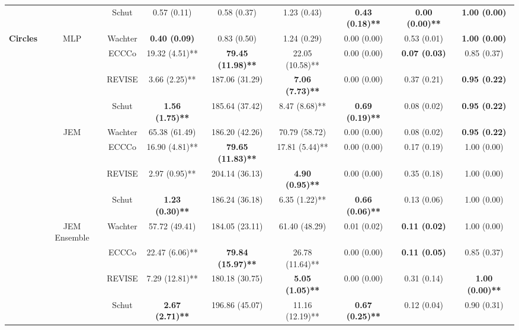 \begin{table}
{\begin{tabular}[t]{>{}c|c|c|c|c|c|c|c|c}
 &  & Schut & 0.57 (0.11) & 0.58 (0.37) & 1.23 (0.43) & \textbf{0.43 (0.18)**} & \textbf{0.00 (0.00)**} & \textbf{1.00 (0.00)}\\

\multirow{-12}{*}{\centering\arraybackslash \textbf{Circles}} & \multirow{-6}{*}{\centering\arraybackslash MLP} & Wachter & \textbf{0.40 (0.09)} & 0.83 (0.50) & 1.24 (0.29) & 0.00 (0.00) & 0.53 (0.01) & \textbf{1.00 (0.00)}\\
\cline{1-9}
 &  & ECCCo & 19.32 (4.51)** & \textbf{79.45 (11.98)**} & 22.05 (10.58)** & 0.00 (0.00) & \textbf{0.07 (0.03)} & 0.85 (0.37)\\

 &  & REVISE & 3.66 (2.25)** & 187.06 (31.29) & \textbf{7.06 (7.73)**} & 0.00 (0.00) & 0.37 (0.21) & \textbf{0.95 (0.22)}\\

 &  & Schut & \textbf{1.56 (1.75)**} & 185.64 (37.42) & 8.47 (8.68)** & \textbf{0.69 (0.19)**} & 0.08 (0.02) & \textbf{0.95 (0.22)}\\

 & \multirow{-4}{*}{\centering\arraybackslash JEM} & Wachter & 65.38 (61.49) & 186.20 (42.26) & 70.79 (58.72) & 0.00 (0.00) & 0.08 (0.02) & \textbf{0.95 (0.22)}\\
\cline{2-9}
 &  & ECCCo & 16.90 (4.81)** & \textbf{79.65 (11.83)**} & 17.81 (5.44)** & 0.00 (0.00) & 0.17 (0.19) & 1.00 (0.00)\\

 &  & REVISE & 2.97 (0.95)** & 204.14 (36.13) & \textbf{4.90 (0.95)**} & 0.00 (0.00) & 0.35 (0.18) & 1.00 (0.00)\\

 &  & Schut & \textbf{1.23 (0.30)**} & 186.24 (36.18) & 6.35 (1.22)** & \textbf{0.66 (0.06)**} & 0.13 (0.06) & 1.00 (0.00)\\

 & \multirow{-4}{*}{\centering\arraybackslash JEM Ensemble} & Wachter & 57.72 (49.41) & 184.05 (23.11) & 61.40 (48.29) & 0.01 (0.02) & \textbf{0.11 (0.02)} & 1.00 (0.00)\\
\cline{2-9}
 &  & ECCCo & 22.47 (6.06)** & \textbf{79.84 (15.97)**} & 26.78 (11.64)** & 0.00 (0.00) & \textbf{0.11 (0.05)} & 0.85 (0.37)\\

 &  & REVISE & 7.29 (12.81)** & 180.18 (30.75) & \textbf{5.05 (1.05)**} & 0.00 (0.00) & 0.31 (0.14) & \textbf{1.00 (0.00)**}\\

 &  & Schut & \textbf{2.67 (2.71)**} & 196.86 (45.07) & 11.16 (12.19)** & \textbf{0.67 (0.25)**} & 0.12 (0.04) & 0.90 (0.31)\\


\end{tabular}}
\end{table}
